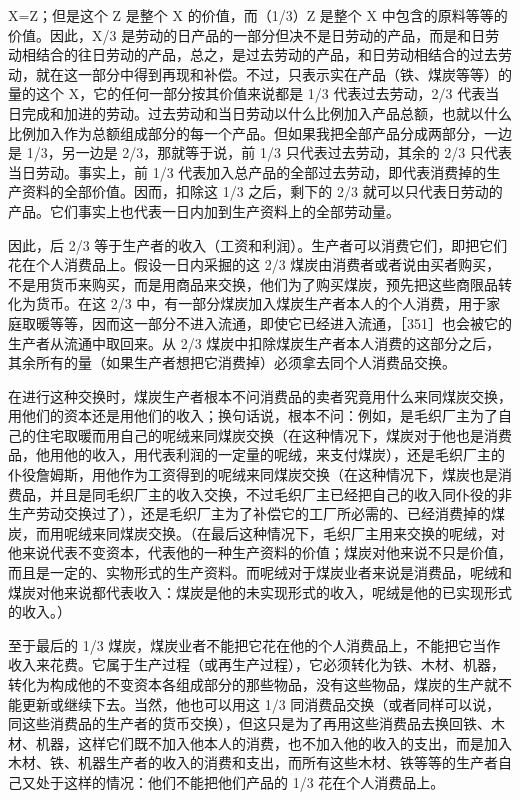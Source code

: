 X=Z；但是这个 Z 是整个 X 的价值，而（1/3）Z 是整个 X 中包含的原料等等的价值。因此，X/3 是劳动的日产品的一部分\fontbox{~\{}但决不是日劳动的产品，而是和日劳动相结合的往日劳动的产品，总之，是过去劳动的产品\fontbox{\}~}，和日劳动相结合的过去劳动，就在这一部分中得到再现和补偿。不过，只表示实在产品（铁、煤炭等等）的量的这个 X，它的任何一部分按其价值来说都是 1/3 代表过去劳动，2/3 代表当日完成和加进的劳动。过去劳动和当日劳动以什么比例加入产品总额，也就以什么比例加入作为总额组成部分的每一个产品。但如果我把全部产品分成两部分，一边是 1/3，另一边是 2/3，那就等于说，前 1/3 只代表过去劳动，其余的 2/3 只代表当日劳动。事实上，前 1/3 代表加入总产品的全部过去劳动，即代表消费掉的生产资料的全部价值。因而，扣除这 1/3 之后，剩下的 2/3 就可以只代表日劳动的产品。它们事实上也代表一日内加到生产资料上的全部劳动量。

因此，后 2/3 等于生产者的收入（工资和利润）。生产者可以消费它们，即把它们花在个人消费品上。假设一日内采掘的这 2/3 煤炭由消费者或者说由买者购买，不是用货币来购买，而是用商品来交换，他们为了购买煤炭，预先把这些商限品转化为货币。在这 2/3 中，有一部分煤炭加入煤炭生产者本人的个人消费，用于家庭取暖等等，因而这一部分不进入流通，即使它已经进入流通，［351］也会被它的生产者从流通中取回来。从 2/3 煤炭中扣除煤炭生产者本人消费的这部分之后，其余所有的量（如果生产者想把它消费掉）必须拿去同个人消费品交换。

在进行这种交换时，煤炭生产者根本不问消费品的卖者究竟用什么来同煤炭交换，用他们的资本还是用他们的收入；换句话说，根本不问：例如，是毛织厂主为了自己的住宅取暖而用自己的呢绒来同煤炭交换（在这种情况下，煤炭对于他也是消费品，他用他的收入，用代表利润的一定量的呢绒，来支付煤炭），还是毛织厂主的仆役詹姆斯，用他作为工资得到的呢绒来同煤炭交换（在这种情况下，煤炭也是消费品，并且是同毛织厂主的收入交换，不过毛织厂主已经把自己的收入同仆役的非生产劳动交换过了），还是毛织厂主为了补偿它的工厂所必需的、已经消费掉的煤炭，而用呢绒来同煤炭交换。（在最后这种情况下，毛织厂主用来交换的呢绒，对他来说代表不变资本，代表他的一种生产资料的价值；煤炭对他来说不只是价值，而且是一定的、实物形式的生产资料。而呢绒对于煤炭业者来说是消费品，呢绒和煤炭对他来说都代表收入：煤炭是他的未实现形式的收入，呢绒是他的已实现形式的收入。）

至于最后的 1/3 煤炭，煤炭业者不能把它花在他的个人消费品上，不能把它当作收入来花费。它属于生产过程（或再生产过程），它必须转化为铁、木材、机器，转化为构成他的不变资本各组成部分的那些物品，没有这些物品，煤炭的生产就不能更新或继续下去。当然，他也可以用这 1/3 同消费品交换（或者同样可以说，同这些消费品的生产者的货币交换），但这只是为了再用这些消费品去换回铁、木材、机器，这样它们既不加入他本人的消费，也不加入他的收入的支出，而是加入木材、铁、机器生产者的收入的消费和支出，而所有这些木材、铁等等的生产者自己又处于这样的情况：他们不能把他们产品的 1/3 花在个人消费品上。


